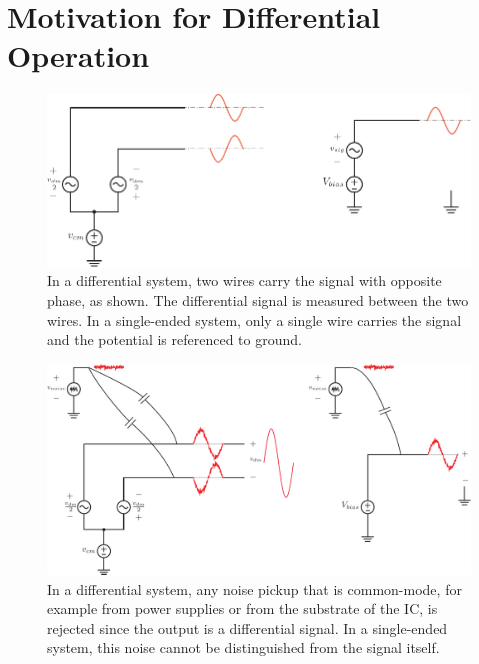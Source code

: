 \section{Motivation for Differential Operation}
\begin{figure}[tb]
\centering
\includegraphics[width=0.75\columnwidth]{diff_vs_cm.pdf} 
\caption{In a differential system, two wires carry the signal with opposite phase, as shown.  The differential signal is measured between the two wires.  In a single-ended system, only a single wire carries the signal and the potential is referenced to ground.}
\label{fig:diffckt}
\end{figure}
\begin{figure}[tb]
\centering
\includegraphics[width=0.85\columnwidth]{diff_cm_noise.pdf} 
\caption{In a differential system, any noise pickup that is common-mode, for example from power supplies or from the substrate of the IC, is rejected since the output is a differential signal.  In a single-ended system, this noise cannot be distinguished from the signal itself.}
\label{fig:noisereject}
\end{figure}

